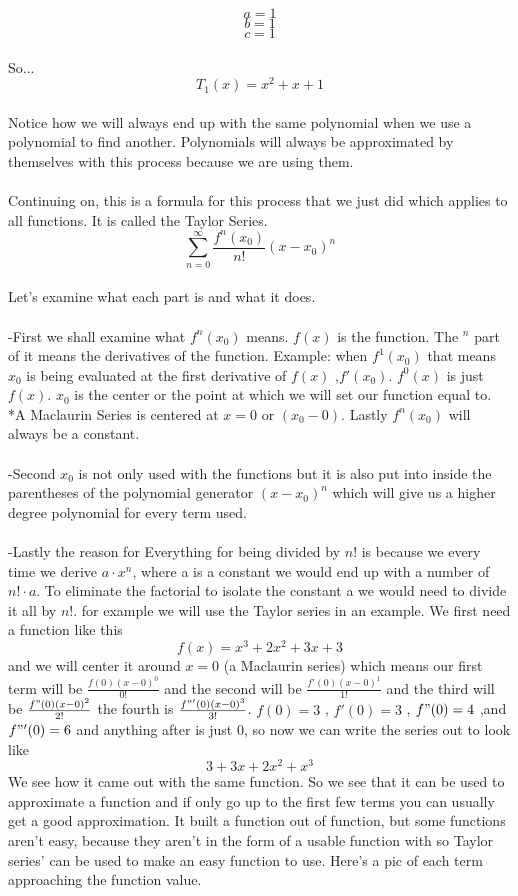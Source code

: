 \documentclass[a4paper,openright, 14pt]{article}
\begin{document}
$$a=1$$
$$b=1$$
$$c=1$$
\\ So...
$$T_1(x)= x^2 +x +1$$
\\
Notice how we will always end up with the same polynomial when we use a polynomial to find another. Polynomials will always be approximated by themselves with this process because we are using them.
\\\\
Continuing on, this is a formula for this process that we just did which applies to all functions. It is called the Taylor Series.
$$\sum_{n=0} ^\infty \frac{f^n(x_0)}{n!} (x-x_0)^n$$
\\
Let's examine what each part is and what it does.\\\\
-First we shall examine what $f^n(x_0)$ means. $f(x)$ is the function. The $^n$ part of it means the derivatives of the function. Example: when $f^1(x_0 )$ that means $x_0$ is being evaluated at the first derivative of $f(x)$ ,$f'(x_0)$. $f^0 (x)$ is just $f(x)$. $x_0$ is the center or the point at which we will set our function equal to. *A Maclaurin Series is centered at $x=0$ or $(x_0 -0)$. Lastly $f^n (x_0)$ will always be a constant. \\\\
-Second $x_0$ is not only used with the functions but it is also put into inside the parentheses of the polynomial generator $(x-x_0)^n$ which will give us a higher degree polynomial for every term used.\\\\
-Lastly the reason for Everything for being divided by $n!$ is because we every time we derive $a\cdot x^n$, where a is a constant we would end up with a number of $n! \cdot a$. To eliminate the factorial to isolate the constant a we would need to divide it all by $n!$.
for example we will use the Taylor series in an example. We first need a function like this $$f(x)=x^3+2x^2+3x+3$$ and we will center it around $x=0$ (a Maclaurin series) which means our first term will be $\frac{f(0)(x-0)^0}{0!}$ and the second will be $\frac{f'(0)(x-0)^1}{1!}$ and the third will be $\frac{f"(0)(x-0)^2}{2!}$ the fourth is $\frac{f"'(0)(x-0)^3}{3!}$.
$f(0)=3$ , $f'(0)=3$ , $f"(0)=4$ ,and $f"'(0)=6$ and anything after is just 0, so now we can write the series out to look like $$3+3x+2x^2+x^3$$ We see how it came out with the same function. So we see that it can be used to approximate a function and if only go up to the first few terms you can usually get a good approximation. It built a function out of function, but some functions aren't easy, because they aren't in the form of a usable function with so Taylor series' can be used to make an easy function to use. Here's a pic of each term approaching the function value.
\end{document}
